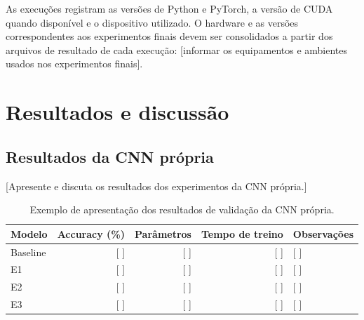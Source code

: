 \documentclass[10pt,a4paper]{article}
\begin{document}
As execuções registram as versões de Python e PyTorch, a versão de CUDA quando
disponível e o dispositivo utilizado. O hardware e as versões correspondentes
aos experimentos finais devem ser consolidados a partir dos arquivos de
resultado de cada execução: [informar os equipamentos e ambientes usados nos
experimentos finais].

\section{Resultados e discussão}

\subsection{Resultados da CNN própria}

[Apresente e discuta os resultados dos experimentos da CNN própria.]

\begin{table}[H]
\centering
\caption{Exemplo de apresentação dos resultados de validação da CNN própria.}
\label{tab:resultados_cnn}
\small
\begin{tabular}{lrrrl}
\toprule
Modelo & Accuracy (\%) & Parâmetros & Tempo de treino & Observações\\
\midrule
Baseline & [ ] & [ ] & [ ] & [ ]\\
E1 & [ ] & [ ] & [ ] & [ ]\\
E2 & [ ] & [ ] & [ ] & [ ]\\
E3 & [ ] & [ ] & [ ] & [ ]\\
\bottomrule
\end{tabular}
\end{table}
\end{document}
